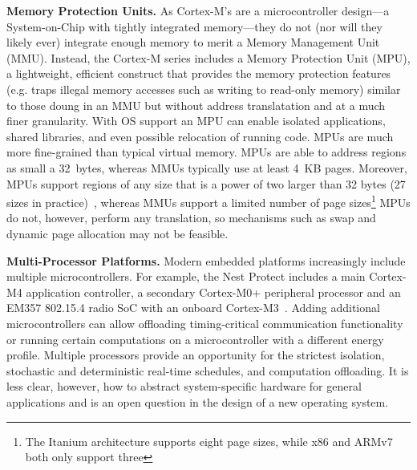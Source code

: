 {\bf Memory Protection Units.}
As Cortex-M's are a microcontroller design---a System-on-Chip with tightly
integrated memory---they do not (nor will they likely ever) integrate enough
memory to merit a Memory Management Unit (MMU). Instead, the Cortex-M series
includes a Memory Protection Unit (MPU), a lightweight, efficient construct
that provides the memory protection features (e.g. traps illegal memory
accesses such as writing to read-only memory) similar to those doung in an MMU
but without address translatation and at a much finer granularity.
With OS support an MPU can enable isolated applications, shared libraries, and
even possible relocation of running code.
MPUs are much more fine-grained than typical virtual memory. MPUs are able to
address regions as small a 32~bytes, whereas MMUs typically use at least 4~KB
pages. Moreover, MPUs support regions of any size that is a power of two larger
than 32 bytes (27 sizes in practice)~\cite{cortexm4-ug:ch4.5}, whereas MMUs
support a limited number of page sizes\footnote{The Itanium architecture
supports eight page sizes, while x86 and ARMv7 both only support three}
MPUs do not, however, perform any translation, so mechanisms such as swap and
dynamic page allocation may not be feasible.

{\bf Multi-Processor Platforms.}
Modern embedded platforms increasingly include multiple microcontrollers.
For example, the Nest
Protect includes a main Cortex-M4 application controller, a secondary
Cortex-M0+ peripheral processor and an EM357 802.15.4 radio SoC with an
onboard Cortex-M3~\cite{nestprotect-teardown}.
Adding additional microcontrollers can allow offloading timing-critical
communication functionality or running certain computations on a microcontroller
with a different energy profile.
Multiple
processors provide an opportunity for
the strictest isolation, stochastic and deterministic real-time schedules, and
computation offloading. It is less clear, however, how to abstract
system-specific hardware for general applications and is an open question in
the design of a new operating system.


